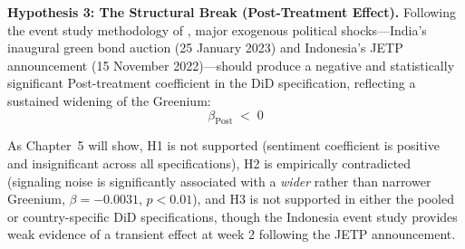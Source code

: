 \documentclass[12pt,a4paper]{article}
\begin{document}
\vspace{0.3em}
\noindent\textbf{Hypothesis 3: The Structural Break (Post-Treatment Effect).}
Following the event study methodology of \citet{MacKinlay1997}, major exogenous political shocks---India's inaugural green bond auction (25 January 2023) and Indonesia's JETP announcement (15 November 2022)---should produce a negative and statistically significant Post-treatment coefficient in the DiD specification, reflecting a sustained widening of the Greenium:
\begin{equation}
\beta_{\text{Post}} \;<\; 0
\end{equation}

\vspace{0.5em}
\noindent As Chapter~5 will show, H1 is not supported (sentiment coefficient is positive and insignificant across all specifications), H2 is empirically contradicted (signaling noise is significantly associated with a \textit{wider} rather than narrower Greenium, $\beta = -0.0031$, $p < 0.01$), and H3 is not supported in either the pooled or country-specific DiD specifications, though the Indonesia event study provides weak evidence of a transient effect at week 2 following the JETP announcement.




\newpage

\end{document}
